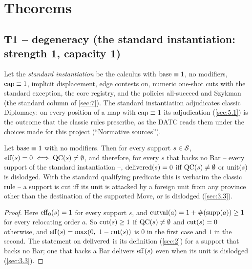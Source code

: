 \documentclass[12pt,a4paper]{article}
\begin{document}
\section{Theorems}\label{sec:8}

\subsection{T1 -- degeneracy (the standard instantiation: strength 1, capacity 1)}\label{sec:8.1}

\begin{theorem}[degeneracy]\label{thm:T1}
Let the \emph{standard instantiation} be the calculus with $\operatorname{base} \equiv 1$, no modifiers, $\operatorname{cap} \equiv 1$, implicit displacement, edge contests on, numeric one-shot cuts with the standard exception, the core registry, and the policies all-succeed and Szykman (the standard column of \cref{sec:7}).
The standard instantiation adjudicates classic Diplomacy: on every position of a map with $\operatorname{cap} \equiv 1$ its adjudication (\cref{sec:5.1}) is the outcome that the classic rules prescribe, as the DATC reads them under the choices made for this project (``Normative sources'').
\end{theorem}

\begin{lemma}\label{lem:L2}
Let $\operatorname{base} \equiv 1$ with no modifiers.
Then for every support $s \in \mathcal{S}$, $\operatorname{eff}(s) = 0 \iff \operatorname{QC}(s) \ne \emptyset$, and therefore, for every $s$ that backs no Bar -- every support of the standard instantiation --, $\operatorname{delivered}(s) = 0$ iff $\operatorname{QC}(s) \ne \emptyset$ or $\operatorname{unit}(s)$ is dislodged.
With the standard qualifying predicate this is verbatim the classic rule -- a support is cut iff its unit is attacked by a foreign unit from any province other than the destination of the supported Move, or is dislodged (\cref{sec:3.3}).
\end{lemma}
\begin{proof}
Here $\operatorname{eff}_0(s) = 1$ for every support $s$, and $\operatorname{cutval}(a) = 1 + \#(\operatorname{supp}(a)) \ge 1$ for every relocating order $a$.
So $\operatorname{cut}(s) \ge 1$ if $\operatorname{QC}(s) \ne \emptyset$ and $\operatorname{cut}(s) = 0$ otherwise, and $\operatorname{eff}(s) = \max(0,\ 1 - \operatorname{cut}(s))$ is $0$ in the first case and $1$ in the second.
The statement on $\operatorname{delivered}$ is its definition (\cref{sec:2}) for a support that backs no Bar; one that backs a Bar delivers $\operatorname{eff}(s)$ even when its unit is dislodged (\cref{sec:3.3}).
\end{proof}
\end{document}
